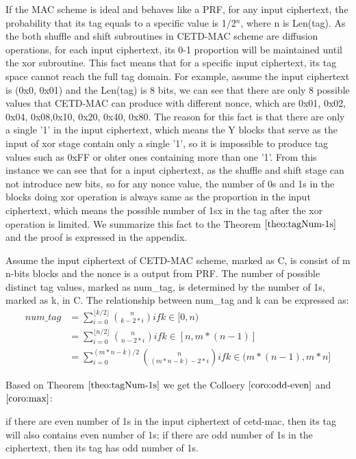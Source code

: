 If the MAC scheme is ideal and behaves like a PRF, for any input ciphertext, the probability that its tag equals to a specific value is 1/2$^n$, where n is Len(tag). 
As the both shuffle and shift subroutines in CETD-MAC scheme are diffusion operations, for each input ciphertext, its 0-1 proportion will be maintained until the xor subroutine. This fact means that for a specific input ciphertext, its tag space cannot reach the full tag domain. For example, assume the input ciphertext is (0x0, 0x01) and the Len(tag) is 8 bits, we can see that there are only 8 possible values that CETD-MAC can produce with different nonce, which are {0x01, 0x02, 0x04, 0x08,0x10, 0x20, 0x40, 0x80}. The reason for this fact is that there are only a single '1' in the input ciphertext, which means the Y blocks that serve as the input of xor stage contain only a single '1', so it is impossible to produce tag values such as 0xFF or ohter ones containing more than one '1'. From this instance we can see that for a input ciphertext, as the shuffle and shift stage can not introduce new bits, so for any nonce value, the number of 0s and 1s in the blocks doing xor operation is always same as the proportion in the input ciphertext, which means the possible number of 1sx in the tag after the xor operation is limited. We summarize this fact to the Theorem $\ref{theo:tagNum-1s}$ and the proof is expressed in the appendix.
\begin{theorem}\label{theo:tagNum-1s}
Assume the input ciphertext of CETD-MAC scheme, marked as C,  is consist of m n-bits blocks and the nonce is a output from PRF. The number of possible distinct tag values, marked as num\_tag, is determined by the number of 1s, marked as k, in C. The relationship between num\_tag and k can be expressed as:
\begin{equation}\label{equ:tagNum-1s}
\begin{split}
num\_tag &= \sum_{i=0}^{\lfloor k/2 \rfloor} \binom{n}{k-2*i} if k \in [0,n)\\ 
		& =\sum_{i=0}^{\lfloor n/2 \rfloor} \binom{n}{n-2*i} if k \in [n,m*(n-1)]\\
		& = \sum_{i=0}^{(m*n-k)/2} \binom{n}{(m*n - k)-2*i} if k \in (m*(n-1),m*n] 	 
\end{split}
\end{equation}
\end{theorem}
Based on Theorem $\ref{theo:tagNum-1s}$ we get the Colloery $\ref{coro:odd-even}$ and $\ref{coro:max}$:
\begin{corollary} \label{coro:odd-even}
if there are even number of 1s in the input ciphertext of cetd-mac, then its tag will also contains even number of 1s; if there are odd number of 1s in the ciphertext, then its tag has odd number of 1s.
\end{corollary}
